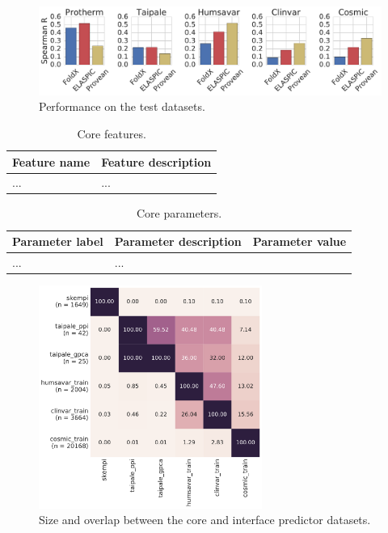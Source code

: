 \begin{figure}[h]
	\centering
	\includegraphics[width=1.0\textwidth]{static/elaspic_training_set/core_machine_learning/final_performance.pdf}
	\caption{Performance on the test datasets.}
\end{figure}

\clearpage


\begin{table}[h]
\caption{Core features.} \label{tab:core_features}
\begin{tabular}{l | p{13cm}}
	\toprule
	Feature name & Feature description \\
	\midrule
	... & ... \\
	\bottomrule
\end{tabular}
\end{table}


\begin{table}[h]
\caption{Core parameters.} \label{tab:core_parameters}
\begin{tabular}{l | l | l}
	\toprule
	Parameter label & Parameter description & Parameter value \\
	\midrule
	... & ... \\
	\bottomrule
\end{tabular}
\end{table}




\begin{figure}[h]
	\centering
	\includegraphics[width=0.65\textwidth]{static/elaspic_training_set/interface_data_statistics/training_set_overlap_final.pdf}
	\caption{Size and overlap between the core and interface predictor datasets.}
\end{figure}

